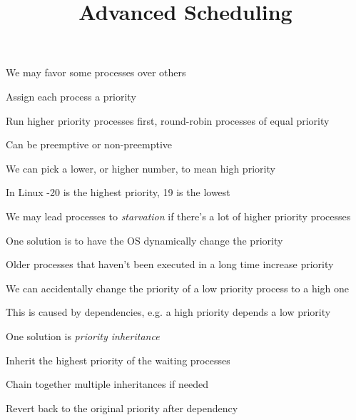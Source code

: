 

\title{Advanced Scheduling}


  \begin{frame}
    \titlepage
  \end{frame}

  \begin{slide}


    We may favor some processes over others

    \leftspace{}Assign each process a priority
    \medskip

    Run higher priority processes first, round-robin processes of equal priority

    \leftspace{}Can be preemptive or non-preemptive

  \end{slide}

  \begin{slide}


    We can pick a lower, or higher number, to mean high priority

    \leftspace{}In Linux -20 is the highest priority, 19 is the lowest
    \medskip

    We may lead processes to \textit{starvation} if there's a lot of higher
    priority processes
    \medskip

    One solution is to have the OS dynamically change the priority

    \leftspace{}Older processes that haven't been executed in a long time increase priority

  \end{slide}

  \begin{slide}


    We can accidentally change the priority of a low priority process to a high one

    \leftspace{}This is caused by dependencies, e.g. a high priority depends a low priority
    \medskip

    One solution is \textit{priority inheritance}

    \leftspace{}Inherit the highest priority of the waiting processes

    \leftspace{}Chain together multiple inheritances if needed

    \leftspace{}Revert back to the original priority after dependency

  \end{slide}

